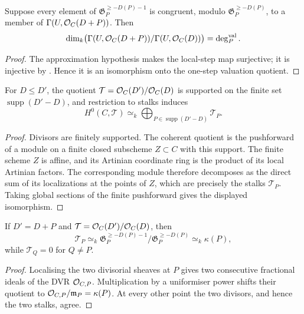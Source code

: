 \begin{theorem}
  \label{thm:adelic_local_step_dim_eq_residue_degree}
  \leanok
  Suppose every element of \(\mathfrak G_P^{\ge-D(P)-1}\) is congruent,
  modulo \(\mathfrak G_P^{\ge-D(P)}\), to a member of
  \(\Gamma(U,\mathcal{O}_{C}(D+P))\).  Then
  \[
    \dim_k\bigl(\Gamma(U,\mathcal{O}_{C}(D+P))/\Gamma(U,\mathcal{O}_{C}(D))\bigr)
      =\deg_P^{\mathrm{val}}.
  \]
\end{theorem}
\begin{proof}
  \leanok
  The approximation hypothesis makes the local-step map surjective; it is
  injective by .  Hence it is an
  isomorphism onto the one-step valuation quotient.
\end{proof}

\begin{proposition}
  \label{thm:adelic_finite_support_quotient_sections}
  \notready
  For \(D\le D'\), the quotient
  \(\mathcal T=\mathcal{O}_{C}(D')/\mathcal{O}_{C}(D)\) is supported on the finite set
  \(\operatorname{supp}(D'-D)\), and restriction to stalks induces
  \[
    H^0(C,\mathcal T)\simeq_k
      \bigoplus_{P\in\operatorname{supp}(D'-D)}\mathcal T_P.
  \]
\end{proposition}
\begin{proof}
  Divisors are finitely supported.  The coherent quotient is the pushforward
  of a module on a finite closed subscheme \(Z\subset C\) with this support.
  The finite scheme \(Z\) is affine, and its Artinian coordinate ring is the
  product of its local Artinian factors.  The corresponding module therefore
  decomposes as the direct sum of its localizations at the points of \(Z\),
  which are precisely the stalks \(\mathcal T_P\).  Taking global sections of
  the finite pushforward gives the displayed isomorphism.
\end{proof}

\begin{proposition}
  \label{thm:adelic_twist_stalk_quotient}
  \notready
  If \(D'=D+P\) and
  \(\mathcal T=\mathcal{O}_{C}(D')/\mathcal{O}_{C}(D)\), then
  \[
    \mathcal T_P\simeq_k
      \mathfrak G_P^{\ge-D(P)-1}/\mathfrak G_P^{\ge-D(P)}
      \simeq_k\kappa(P),
  \]
  while \(\mathcal T_Q=0\) for \(Q\ne P\).
\end{proposition}
\begin{proof}
  Localising the two divisorial sheaves at \(P\) gives two consecutive
  fractional ideals of the DVR \(\mathcal{O}_{C,P}\).  Multiplication by a
  uniformiser power shifts their quotient to
  \(\mathcal{O}_{C,P}/\mathfrak m_P=\kappa(P)\).  At every other point the two
  divisors, and hence the two stalks, agree.
\end{proof}


